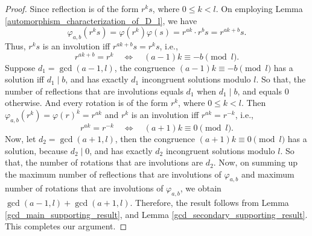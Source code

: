 \documentclass{amsart}
\theoremstyle{definition}
\theoremstyle{remark}
\numberwithin{equation}{section}
\begin{document}
        \begin{proof}
            
             Since reflection is of the form \(r^ks \), where \(0\le k<l\). On employing Lemma \ref{automorphism_characterization_of_D_l}, we have
             \[
                \varphi_{a,b}(r^ks)=\varphi(r^k)\varphi(s) = r^{ak}\cdot r^bs  = r^{ak+b}s.
             \]
            Thus, \(r^ks\) is an involution iff \(r^{ak+b}s =  r^ks\), i.e.,
            \[
                r^{ak+b} = r^k \quad\Longleftrightarrow\quad (a-1)k \equiv -b \pmod l. \tag{1}
            \]
            Suppose $d_1=\gcd(a-1,l)$, the congruence \((a-1)k\equiv -b\pmod l\) has a solution iff \(d_1\mid b\), and has exactly \(d_1\) incongruent solutions modulo \(l\). So that, the number of reflections that are involutions equals \(d_1\) when \(d_1\mid b\), and equals \(0\) otherwise.
            And every rotation is of the form \(r^k\), where \(0\le k<l\). Then $\varphi_{a,b}(r^k)=\varphi(r)^k=r^{ak}$ and \(r^k\) is an involution iff \(r^{ak} = r^{-k}\), i.e.,
            \[
                r^{ak} = r^{-k} \quad\Longleftrightarrow\quad (a+1)k \equiv 0 \pmod l. \tag{2}
            \]
            Now, let \(d_2=\gcd(a+1,l)\), then the congruence \((a+1)k\equiv 0\pmod l\) has a solution, because \(d_2\mid 0\), and has exactly \(d_2\) incongruent solutions modulo \(l\). So that, the number of rotations that are involutions are $d_2$. Now, on summing up the maximum number of reflections that are involutions of $\varphi_{a, b}$ and maximum number of rotations that are involutions of $\varphi_{a, b}$, we obtain $\gcd(a - 1, l) + \gcd(a + 1, l)$. Therefore, the result follows from Lemma \ref{gcd_main_supporting_result}, and Lemma \ref{gcd_secondary_supporting_result}. This completes our argument.
        \end{proof}
    
\end{document}
